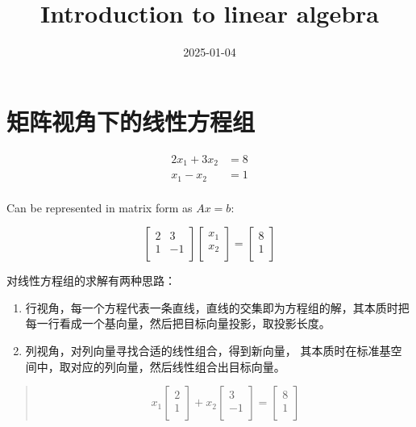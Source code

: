 \documentclass[
  letterpaper,
  DIV=11,
  numbers=noendperiod]{scrartcl}
\title{Introduction to linear algebra}
\author{}
\date{2025-01-04}
\begin{document}
\maketitle

\section{矩阵视角下的线性方程组}\label{ux77e9ux9635ux89c6ux89d2ux4e0bux7684ux7ebfux6027ux65b9ux7a0bux7ec4}

\[
\begin{aligned}
2x_1 + 3x_2 &= 8 \\
x_1 - x_2 &= 1 \\
\end{aligned}
\]

Can be represented in matrix form as \(Ax = b\):

\[
\begin{bmatrix}
2 & 3 \\
1 & -1 \\
\end{bmatrix}
\begin{bmatrix}
x_1 \\
x_2 \\
\end{bmatrix}
=
\begin{bmatrix}
8 \\
1 \\
\end{bmatrix}
\]

对线性方程组的求解有两种思路：

\begin{enumerate}
\def\labelenumi{\arabic{enumi}.}
\item
  行视角，每一个方程代表一条直线，直线的交集即为方程组的解，其本质时把每一行看成一个基向量，然后把目标向量投影，取投影长度。
\item
  列视角，对列向量寻找合适的线性组合，得到新向量，
  其本质时在标准基空间中，取对应的列向量，然后线性组合出目标向量。
\end{enumerate}

\begin{quote}
\[ 
x_1\begin{bmatrix} 
2 \\ 
1 \\
\end{bmatrix} +
x_2 \begin{bmatrix} 
3 \\
-1 \\
\end{bmatrix} = 
\begin{bmatrix} 
8 \\
1 \\
\end{bmatrix}
\]
\end{quote}
\end{document}

